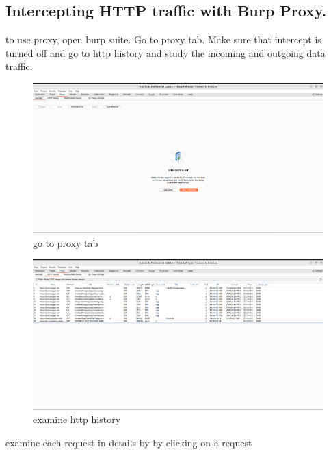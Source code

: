 \documentclass[
	a4paper, %
	12pt, %
]{CSSullivanBusinessReport}
\begin{document}
\subsection*{Intercepting HTTP traffic with Burp Proxy.}
\begin{fullwidth}
    to use proxy, open burp suite. Go to proxy tab. Make sure that intercept is turned off and go to http history and study the incoming and outgoing data traffic.
\end{fullwidth}
\begin{figure}[H]
    \centering
    \includegraphics[width=1\textwidth]{Images/anikaScreensots/Proxy1.png}
    \caption{go to proxy tab}
    \label{fig:enter-label}
\end{figure}

\begin{figure}[H]
    \centering
    \includegraphics[width=1\textwidth]{Images/anikaScreensots/proxy2.png}
    \caption{examine http history}
    \label{fig:enter-label}
\end{figure}
examine each request in details by by clicking on a request
\end{document}
